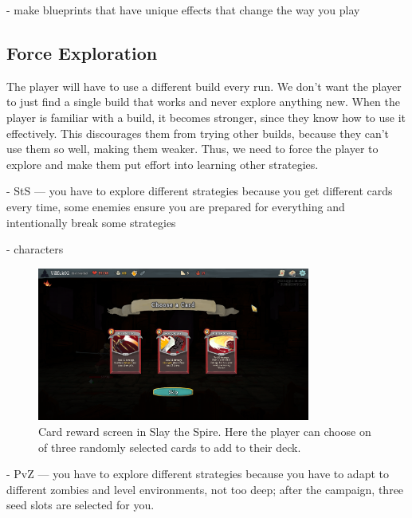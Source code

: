 - make blueprints that have unique effects that change the way you play

\subsection{Force Exploration} \label{sec:goal-force-exploration}

The player will have to use a different build every run.
We don't want the player to just find a single build that works and never explore anything new.
When the player is familiar with a build, it becomes stronger, since they know how to use it effectively.
This discourages them from trying other builds, because they can't use them so well, making them weaker.
Thus, we need to force the player to explore and make them put effort into learning other strategies.

- StS --- you have to explore different strategies because you get different cards every time, some enemies ensure you are prepared for everything and intentionally break some strategies

- characters

\begin{figure}[htb]
    \centering
    \includegraphics[width=0.8\textwidth]{img/Slay-the-Spire-Reward.png}
    \caption{Card reward screen in Slay the Spire. Here the player can choose on of three randomly selected cards to add to their deck.}
    \label{fig:slay-the-spire-reward}
\end{figure}

- PvZ --- you have to explore different strategies because you have to adapt to different zombies and level environments, not too deep; after the campaign, three seed slots are selected for you.

